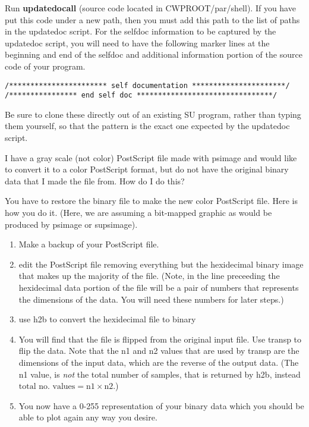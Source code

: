 {{{{{{{\begin{rmans}
Run {\bf updatedocall\/} (source code located in CWPROOT/par/shell).
If you have put this code under a new path, then you must add
this path to the list of paths in the updatedoc script.
For the selfdoc information to be captured by the updatedoc script,
you will need to have the following marker lines at the beginning
and end of the selfdoc and additional information portion of the 
source code of your program.
\begin{verbatim}
/*********************** self documentation **********************/
/**************** end self doc ********************************/
\end{verbatim}
Be sure to clone these directly out of an existing SU program, rather
than typing them yourself, so that the pattern is the exact one
expected by the updatedoc script.
\end{rmans}

\begin{question}
I have a gray scale (not color) PostScript file made with psimage
and would like to convert it to a color PostScript format, but do
not have the original binary data that I made the file from. How
do I do this?
\end{question}

\begin{rmans}
You have to restore the binary file to make the new color PostScript
file.  Here is how you do it. (Here, we are assuming a bit-mapped
graphic as would be produced by psimage or supsimage).
\begin{enumerate}
\item Make a backup of your PostScript file.
\item edit the PostScript file removing everything but the
    hexidecimal binary image that makes up the majority of
    the file. (Note, in the line preceeding the hexidecimal data
    portion of the file will be a pair of numbers that represents
    the dimensions of the data. You will need these numbers for
    later steps.)
\item use    h2b   to convert the hexidecimal file to binary
\item You will find that the file is flipped from the original
    input file.  Use   transp   to flip the data. Note that the
    n1 and n2 values that are used by transp are the dimensions
    of the input data, which are the reverse of the output data.
    (The n1 value, is {\em not\/} the total number of samples, that
    is returned by h2b, instead  
$ \mbox{total  no. values} = \mbox{n1}\times \mbox{n2}$.)
\item You now have a 0-255 representation of your binary data
    which you should be able to plot again any way you desire.
\end{enumerate}


\end{rmans}}}}}}}}
